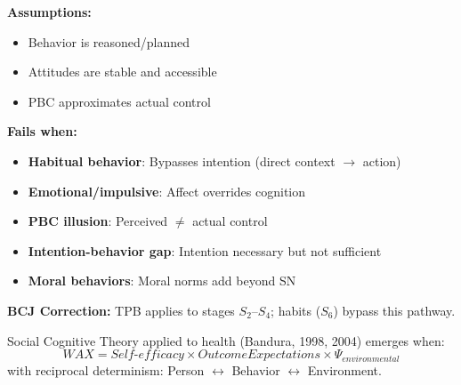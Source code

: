 \begin{tcolorbox}[colback=red!5!white, colframe=red!75!black, title=Boundary Condition: Where Extended TPB Fails]
\textbf{Assumptions:}
\begin{itemize}[nosep]
\item Behavior is reasoned/planned
\item Attitudes are stable and accessible
\item PBC approximates actual control
\end{itemize}

\textbf{Fails when:}
\begin{itemize}[nosep]
\item \textbf{Habitual behavior}: Bypasses intention (direct context $\to$ action)
\item \textbf{Emotional/impulsive}: Affect overrides cognition
\item \textbf{PBC illusion}: Perceived $\neq$ actual control
\item \textbf{Intention-behavior gap}: Intention necessary but not sufficient
\item \textbf{Moral behaviors}: Moral norms add beyond SN
\end{itemize}

\textbf{BCJ Correction:} TPB applies to stages $S_2$--$S_4$; habits ($S_6$) bypass this pathway.
\end{tcolorbox}


\begin{theorem}
\label{thm:sct-health}
Social Cognitive Theory applied to health (Bandura, 1998, 2004) emerges when:
\begin{equation}
\boxed{WAX = Self\text{-}efficacy \times Outcome Expectations \times \Psi_{environmental}}
\end{equation}
with reciprocal determinism: Person $\leftrightarrow$ Behavior $\leftrightarrow$ Environment.
\end{theorem}

